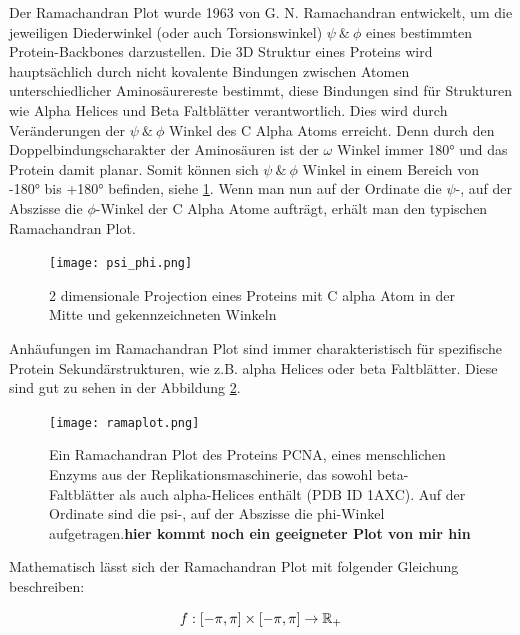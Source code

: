 Der Ramachandran Plot wurde 1963 von G. N. Ramachandran \cite{RAMACHANDRAN.1963} entwickelt, um die jeweiligen Diederwinkel (oder auch Torsionswinkel)  $\psi\ \&\ \phi$ eines bestimmten Protein-Backbones darzustellen. Die 3D Struktur eines Proteins wird hauptsächlich durch nicht kovalente Bindungen zwischen Atomen unterschiedlicher Aminosäurereste bestimmt, diese Bindungen sind für Strukturen wie Alpha Helices und Beta Faltblätter verantwortlich. Dies wird durch Veränderungen der  $\psi\ \&\ \phi$ Winkel des C Alpha Atoms erreicht. Denn durch den Doppelbindungscharakter der Aminosäuren ist der $\omega$ Winkel immer 180° und das Protein damit planar. Somit können sich $\psi\ \&\ \phi$ Winkel in einem Bereich von -180° bis +180° befinden, siehe \ref{fig:psi_phi}. Wenn man nun auf der Ordinate die $\psi$-, auf der Abszisse die $\phi$-Winkel der C Alpha Atome aufträgt, erhält man den typischen Ramachandran Plot. 

\begin{figure}
\texttt{[image: psi\_phi.png]}
\caption{2 dimensionale Projection eines Proteins mit C alpha Atom in der Mitte und gekennzeichneten Winkeln\protect\footnotemark}
\label{fig:psi_phi}
\end{figure}

Anhäufungen im Ramachandran Plot sind immer charakteristisch für spezifische Protein Sekundärstrukturen, wie z.B. alpha Helices oder beta Faltblätter. Diese sind gut zu sehen in der Abbildung \ref{fig:ramaplot}.

\begin{figure}
\texttt{[image: ramaplot.png]}
\caption{Ein Ramachandran Plot des Proteins PCNA, eines menschlichen Enzyms aus der Replikationsmaschinerie, das sowohl beta-Faltblätter als auch alpha-Helices enthält (PDB ID 1AXC). Auf der Ordinate sind die psi-, auf der Abszisse die phi-Winkel aufgetragen.\protect\footnotemark \textbf{hier kommt noch ein geeigneter Plot von mir hin}}
\label{fig:ramaplot}
\end{figure}

Mathematisch lässt sich der Ramachandran Plot mit folgender Gleichung beschreiben:

\begin{equation}
    f : [-\pi,\pi]\times[-\pi,\pi] \rightarrow \mathbb{R}_{+}
    \label{eq:rama_eq}
\end{equation}



